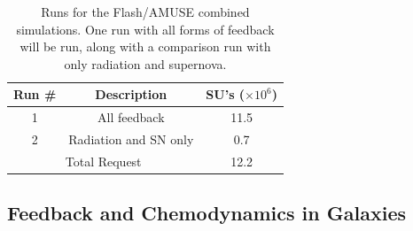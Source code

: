 \documentclass[11pt]{article}
\newcommand{\msun}{$\textrm{M}_{\odot}$}
\begin{document}
\begin{table}
\centering
\begin{tabular}{|c|c|c|}
\hline 
Run \# & %
             Description & SU's ($\times 10^6$) \\
\hline 
1 & %
       All feedback & 11.5 \\
\hline 
2 & %
     Radiation and SN only & 0.7 \\
\hline 
\hline
\multicolumn{2}{|c|}{Total Request} & 12.2 \\

\hline
\end{tabular}
\caption{\small Runs for the Flash/AMUSE combined simulations. One run with all forms of feedback will be run, along with a comparison run with only radiation and supernova.}
\end{table}





\subsection{Feedback and Chemodynamics in Galaxies}
\end{document}
